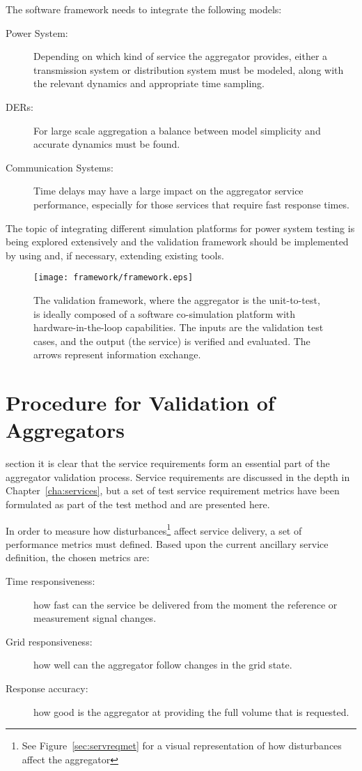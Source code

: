 The software framework needs to integrate the following models:
\begin{description}
	\item[Power System:] Depending on which kind of service the aggregator provides, either a transmission system or distribution system must be modeled, along with the relevant dynamics and appropriate time sampling.
	\item[DERs:] For large scale aggregation a balance between model simplicity and accurate dynamics must be found.
	\item[Communication Systems:] Time delays may have a large impact on the aggregator service performance, especially for those services that require fast response times.
\end{description}

The topic of integrating different simulation platforms for power system testing is being explored extensively and the validation framework should be implemented by using and, if necessary, extending existing tools.

\begin{figure}[ht]
	\centering
	\caption{The validation framework, where the aggregator is the unit-to-test, is ideally composed of a software co-simulation platform with hardware-in-the-loop capabilities. The inputs are the validation test cases, and the output (\ie the service) is verified and evaluated. The arrows represent information exchange.}
	\texttt{[image: framework/framework.eps]}\label{fig:frameworkbig}
\end{figure}

\section{Procedure for Validation of Aggregators} 
 section it is clear that the service requirements form an essential part of the aggregator validation process. Service requirements are discussed in the depth in Chapter~\ref{cha:services}, but a set of test service requirement metrics have been formulated as part of the test method and are presented here.

In order to measure how disturbances\footnote{See Figure~\ref{sec:servreqmet} for a visual representation of how disturbances affect the aggregator} affect service delivery, a set of performance metrics must defined. Based upon the current ancillary service definition, the chosen metrics are:
\begin{description}
	\item[Time responsiveness:] how fast can the service be delivered from the moment the reference or measurement signal changes.
	\item[Grid responsiveness:] how well can the aggregator follow changes in the grid state.
	\item[Response accuracy:] how good is the aggregator at providing the full volume that is requested.
\end{description}

